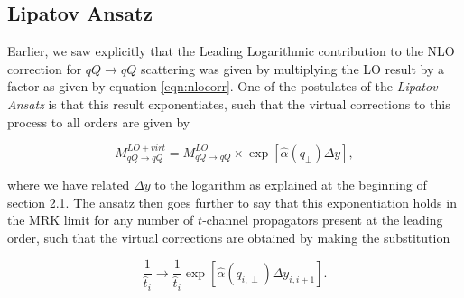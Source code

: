\subsection{Lipatov Ansatz}
Earlier, we saw explicitly that the Leading Logarithmic contribution to the NLO correction for $qQ \to qQ$ scattering was given by multiplying the LO result by a factor as given by equation \ref{eqn:nlocorr}. One of the postulates of the \emph{Lipatov Ansatz} is that this result exponentiates, such that the virtual corrections to this process to all orders are given by

\begin{equation}
M_{qQ \to qQ}^{LO + virt} = M_{qQ \to qQ}^{LO} \times \exp \left[\hat{\alpha}(q_\perp) \Delta y \right],
\end{equation}

where we have related $\Delta y$ to the logarithm as explained at the beginning of section 2.1. The ansatz then goes further to say that this exponentiation holds in the MRK limit for any number of $t$-channel propagators present at the leading order, such that the virtual corrections are obtained by making the substitution

\begin{equation}
\frac{1}{\hat{t}_i} \to \frac{1}{\hat{t}_i} \exp \left[\hat{\alpha}(q_{i,\perp}) \Delta y_{i,i+1} \right].
\label{eqn:lipansatz}
\end{equation}

